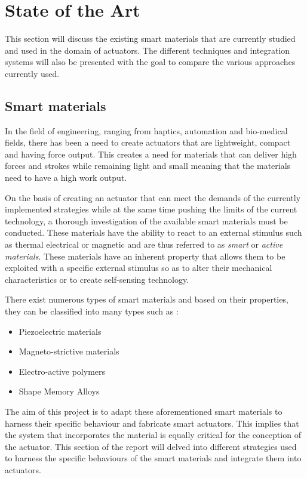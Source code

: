 \section{State of the Art}\label{sec:sota}
This section will discuss the existing smart materials that are currently studied and used in the domain of actuators. The different techniques and integration systems will also be presented with the goal to compare the various approaches currently used.

\subsection{Smart materials}
In the field of engineering, ranging from haptics, automation and bio-medical fields, there has been a need  to create actuators that are lightweight, compact and having force output. This creates a need for materials that can deliver high forces and strokes while remaining light and small meaning that the materials need to have a high work output.

On the basis of creating an actuator that can meet the demands of the currently implemented strategies while at the same time pushing the limits of the current technology, a thorough investigation of the available smart materials must be conducted. These materials have the ability to react to an external stimulus such as thermal electrical or magnetic and are thus referred to as \emph{smart} or \emph{active materials}. These materials have an inherent property that allows them to be exploited with a specific external stimulus so as to alter their mechanical characteristics or to create self-sensing technology.

There exist numerous types of smart materials and based on their properties, they can be classified into many types such as \cite{damodharan_review_2018}:
\begin{itemize}
	\item Piezoelectric materials
	\item Magneto-strictive materials
	\item Electro-active polymers
	\item Shape Memory Alloys
\end{itemize}

The aim of this project is to adapt these aforementioned smart materials to harness their specific behaviour and fabricate smart actuators. This implies that the system that incorporates the material is equally critical for the conception of the actuator. This section of the report will delved into different strategies used to harness the specific behaviours of the smart materials and integrate them into actuators.


